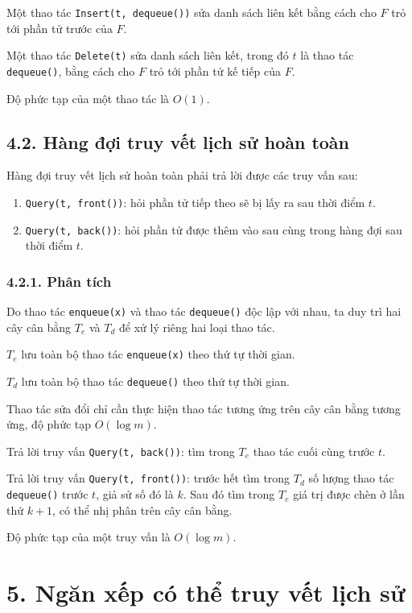\documentclass[11pt]{article}
\begin{document}
Một thao tác \texttt{Insert(t, dequeue())} sửa danh sách liên kết bằng cách
cho \(F\) trỏ tới phần tử trước của \(F\).

Một thao tác \texttt{Delete(t)} sửa danh sách liên kết, trong đó \(t\) là thao
tác \texttt{dequeue()}, bằng cách cho \(F\) trỏ tới phần tử kế tiếp của \(F\).

Độ phức tạp của một thao tác là \(O(1)\).

\subsection*{4.2. Hàng đợi truy vết lịch sử hoàn toàn}

Hàng đợi truy vết lịch sử hoàn toàn phải trả lời được các truy vấn sau:

\begin{enumerate}
  \item \texttt{Query(t, front())}: hỏi phần tử tiếp theo sẽ bị lấy ra sau thời
        điểm \(t\).
  \item \texttt{Query(t, back())}: hỏi phần tử được thêm vào sau cùng trong
        hàng đợi sau thời điểm \(t\).
\end{enumerate}

\subsubsection*{4.2.1. Phân tích}

Do thao tác \texttt{enqueue(x)} và thao tác \texttt{dequeue()} độc lập với
nhau, ta duy trì hai cây cân bằng \(T_e\) và \(T_d\) để xử lý riêng hai loại
thao tác.

\(T_e\) lưu toàn bộ thao tác \texttt{enqueue(x)} theo thứ tự thời gian.

\(T_d\) lưu toàn bộ thao tác \texttt{dequeue()} theo thứ tự thời gian.

Thao tác sửa đổi chỉ cần thực hiện thao tác tương ứng trên cây cân bằng tương
ứng, độ phức tạp \(O(\log m)\).

Trả lời truy vấn \texttt{Query(t, back())}: tìm trong \(T_e\) thao tác cuối
cùng trước \(t\).

Trả lời truy vấn \texttt{Query(t, front())}: trước hết tìm trong \(T_d\) số
lượng thao tác \texttt{dequeue()} trước \(t\), giả sử số đó là \(k\). Sau đó
tìm trong \(T_e\) giá trị được chèn ở lần thứ \(k+1\), có thể nhị phân trên
cây cân bằng.

Độ phức tạp của một truy vấn là \(O(\log m)\).

\section*{5. Ngăn xếp có thể truy vết lịch sử}
\end{document}

